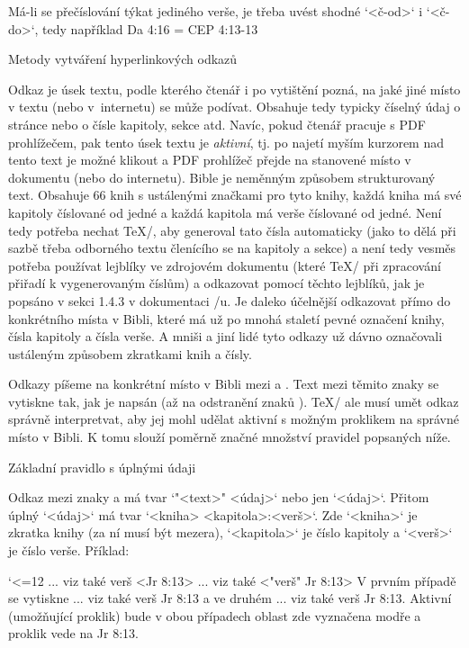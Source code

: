 Má-li se přečíslování týkat jediného verše, je třeba uvést shodné
`<č-od>` i `<č-do>`, tedy například
\begtt
\renum Da 4:16 = CEP 4:13-13
\endtt

\sec[odkazy] Metody vytváření hyperlinkových odkazů

Odkaz je úsek textu, podle kterého čtenář i po vytištění pozná, na jaké jiné místo
v textu (nebo v~internetu) se může podívat. Obsahuje tedy typicky číselný údaj o
stránce nebo o čísle kapitoly, sekce atd. Navíc, pokud čtenář pracuje s PDF
prohlížečem, pak tento úsek textu je {\em aktivní}, tj. po najetí myším
kurzorem nad tento text je možné klikout a PDF prohlížeč přejde na stanovené
místo v dokumentu (nebo do internetu). Bible je neměnným způsobem
strukturovaný text. Obsahuje 66 knih s ustálenými značkami pro tyto knihy,
každá kniha má své kapitoly číslované od jedné a každá kapitola má verše
číslované od jedné. Není tedy potřeba nechat \TeX/, aby generoval tato čísla
automaticky (jako to dělá při sazbě třeba odborného textu členícího se na
kapitoly a sekce) a není tedy vesměs potřeba používat lejblíky ve zdrojovém
dokumentu (které \TeX/ při zpracování přiřadí k vygenerovaným číslům) a odkazovat pomocí
těchto lejblíků, jak je popsáno v sekci 1.4.3 v dokumentaci \OpTeX/u. Je
daleko účelnější odkazovat přímo do konkrétního místa v Bibli, které má už
po mnohá staletí pevné označení knihy, čísla kapitoly a čísla verše.
A mniši a jiní lidé tyto odkazy už dávno označovali ustáleným
způsobem zkratkami knih a čísly.

Odkazy píšeme na konkrétní místo v Bibli mezi \code{<} a \code{>}. Text mezi
těmito znaky se vytiskne tak, jak je napsán (až na odstranění znaků
). \TeX/ ale musí umět odkaz správně interpretvat, aby jej mohl
udělat aktivní s možným proklikem na správné místo v Bibli. K tomu slouží
poměrně značné množství pravidel popsaných níže.

\secc[uudaj] Základní pravidlo s úplnými údaji

Odkaz mezi znaky \code{<} a \code{>} má tvar `"<text>" <údaj>` nebo jen
`<údaj>`. Přitom úplný `<údaj>` má tvar
`<kniha> <kapitola>:<verš>`. Zde `<kniha>` je zkratka knihy (za ní musí být
mezera), `<kapitola>` je číslo kapitoly a `<verš>` je číslo verše.
Příklad:

\begtt \catcode`<=12
... viz také verš <Jr 8:13>
... viz také <"verš" Jr 8:13>
\endtt
V prvním případě se vytiskne ... viz také verš {\Blue Jr 8:13} a ve druhém
... viz také {\Blue verš Jr 8:13}. Aktivní (umožňující proklik) bude v obou případech
oblast zde vyznačena modře a proklik vede na Jr 8:13.

